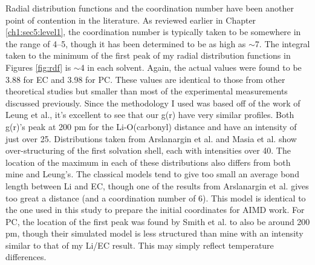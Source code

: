 \begin{ecpc}
   Radial distribution functions and the coordination number have been another point of contention in the literature. As reviewed earlier in Chapter \ref{ch1:sec5:level1}, the 
   coordination number is typically taken to be somewhere in the range of 4--5, though it has been determined to be as high as $\sim$7\cite{castriota2003temperature}. The integral
   taken to the minimum of the first peak of my radial distribution functions in Figures \ref{fig:rdf} is $\sim$4 in each solvent. Again, the actual values were found to be 3.88 for EC 
   and 3.98 for PC. These values are identical to those from other theoretical studies but smaller than most of the experimental measurements discussed previously. Since the methodology
   I used was based off of the work of Leung et al.\cite{leung2010liion}, it's excellent to see that our g(r) have very similar profiles. Both g(r)'s peak at 200 pm for the Li\sur{+}-O(carbonyl) distance
   and have an intensity of just over 25. Distributions taken from Arslanargin et al.\cite{ayse2016ecpc} and Masia et al.\cite{masia2004ethylene} show over-structuring of the first 
   solvation shell, each with intensities over 40. The location of the maximum in each of these distributions also differs from both mine and Leung's. The classical models tend to give
   too small an average bond length between Li\sur{+} and EC, though one of the results from Arslanargin et al.\cite{ayse2016ecpc} gives too great a distance (and a coordination number
   of 6). This model is identical to the one used in this study to prepare the initial coordinates for AIMD work. For PC, the location of the first peak was found by Smith et al.\cite{smith2014x} 
   to also be around 200 pm, though their simulated model is less structured than mine with an intensity similar to that of my Li\sur{+}/EC result. This may simply reflect temperature 
   differences.


\end{ecpc}
